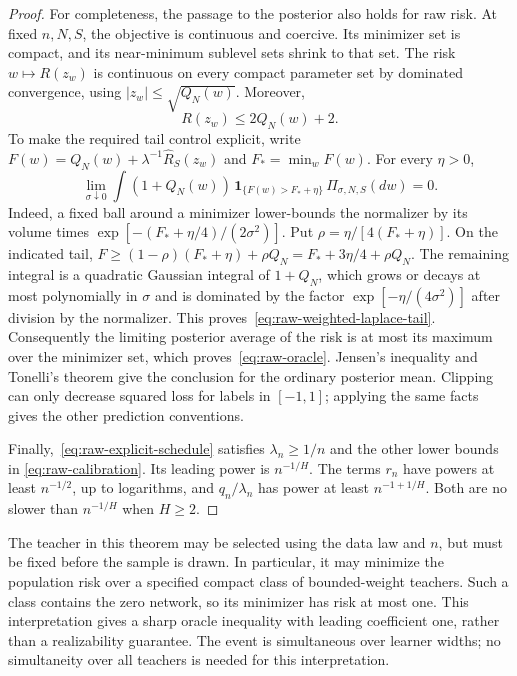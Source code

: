 \begin{proof}
For completeness, the passage to the posterior also holds for raw
risk.  At fixed $n,N,S$, the objective is continuous and coercive.
Its minimizer set is compact, and its near-minimum sublevel sets shrink
to that set.  The risk $w\mapsto R(z_w)$ is continuous on every compact
parameter set by dominated convergence, using
$|z_w|\leq\sqrt{Q_N(w)}$.  Moreover,
\[
 R(z_w)\leq2Q_N(w)+2.
\]
To make the required tail control explicit, write
$F(w)=Q_N(w)+\lambda^{-1}\widehat R_S(z_w)$ and
$F_* = \min_w F(w)$.  For every $\eta>0$,
\begin{equation}
 \lim_{\sigma\downarrow0}
 \int (1+Q_N(w))\,
       \mathbf 1_{\{F(w)>F_*+\eta\}}\,
       \Pi_{\sigma,N,S}(dw)=0.
 \label{eq:raw-weighted-laplace-tail}
\end{equation}
Indeed, a fixed ball around a minimizer lower-bounds the normalizer by
its volume times $\exp[-(F_*+\eta/4)/(2\sigma^2)]$.
Put $\rho=\eta/[4(F_*+\eta)]$.  On the indicated tail,
$F\geq(1-\rho)(F_*+\eta)+\rho Q_N
      =F_*+3\eta/4+\rho Q_N$.
The remaining integral is a quadratic Gaussian integral of $1+Q_N$,
which grows or decays at most polynomially in $\sigma$ and is dominated
by the factor $\exp[-\eta/(4\sigma^2)]$ after division by the
normalizer.  This proves~\eqref{eq:raw-weighted-laplace-tail}.
Consequently the limiting posterior average of the risk is at most its
maximum over the minimizer set, which proves~\eqref{eq:raw-oracle}.  Jensen's inequality and Tonelli's
theorem give the conclusion for the ordinary posterior mean.  Clipping
can only decrease squared loss for labels in $[-1,1]$; applying the same
facts gives the other prediction conventions.

Finally,~\eqref{eq:raw-explicit-schedule} satisfies
$\lambda_n\geq1/n$ and the other lower bounds in
\eqref{eq:raw-calibration}.  Its leading power is $n^{-1/H}$.
The terms $r_n$ have powers at least $n^{-1/2}$, up to logarithms, and
$q_n/\lambda_n$ has power at least $n^{-1+1/H}$.  Both are no slower than
$n^{-1/H}$ when $H\geq2$.
\end{proof}

The teacher in this theorem may be selected using the data law and
$n$, but must be fixed before the sample is drawn.  In particular, it
may minimize the population risk over a specified compact class of
bounded-weight teachers.  Such a class contains the zero network, so
its minimizer has risk at most one.  This interpretation gives a sharp
oracle inequality with leading coefficient one, rather than a
realizability guarantee.  The event is simultaneous over learner widths;
no simultaneity over all teachers is needed for this interpretation.

